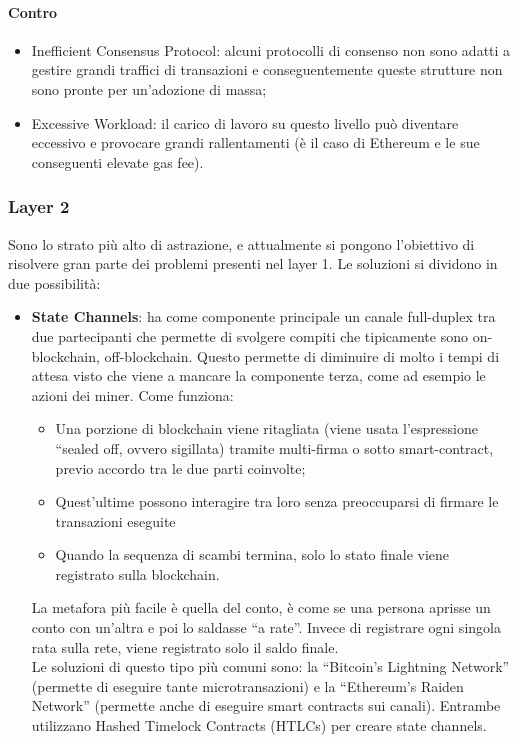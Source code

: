     \paragraph{Contro}
    \begin{itemize}
        \item Inefficient Consensus Protocol: alcuni protocolli di consenso non sono adatti a gestire grandi traffici di transazioni e conseguentemente queste strutture non sono pronte per un'adozione di massa;
        \item Excessive Workload: il carico di lavoro su questo livello può diventare eccessivo e provocare grandi rallentamenti (è il caso di Ethereum e le sue conseguenti
        elevate gas fee).        
    \end{itemize}

    \subsubsection{Layer 2}
    Sono lo strato più alto di astrazione, e attualmente si pongono l'obiettivo di risolvere gran parte dei problemi presenti nel layer 1. Le soluzioni si dividono in due possibilità:
    \begin{itemize}
        \item \textbf{State Channels}: ha come componente principale un canale full-duplex tra due partecipanti che permette di svolgere compiti che tipicamente sono on-blockchain, off-blockchain. 
        Questo permette di diminuire di molto i tempi di attesa visto che viene a mancare la componente terza, come ad esempio le azioni dei miner.
        Come funziona:
        \begin{itemize}
            \item Una porzione di blockchain viene ritagliata (viene usata l’espressione “sealed off, ovvero sigillata) tramite multi-firma o sotto smart-contract, previo accordo tra le due parti coinvolte;
            \item Quest’ultime possono interagire tra loro senza preoccuparsi di firmare le transazioni eseguite
            \item Quando la sequenza di scambi termina, solo lo stato finale viene registrato sulla blockchain.
        \end{itemize}
        La metafora più facile è quella del conto, è come se una persona aprisse un conto con un’altra e poi lo saldasse “a rate”. Invece di registrare ogni singola rata sulla rete, viene 
        registrato solo il saldo finale.\\
        Le soluzioni di questo tipo più comuni sono: la “Bitcoin’s Lightning Network” (permette di eseguire tante microtransazioni) e la “Ethereum’s Raiden Network” (permette anche di eseguire smart contracts 
        sui canali). Entrambe utilizzano Hashed Timelock Contracts (HTLCs) per creare state channels.
    \end{itemize}
